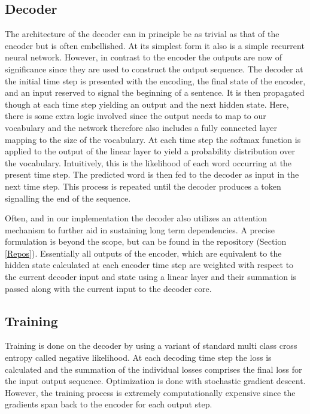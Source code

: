\documentclass{article}
\begin{document}
\subsection{Decoder}
The architecture of the decoder can in principle be as trivial as that of the encoder but is often embellished. At its simplest form it also is a simple recurrent neural network. However, in contrast to the encoder the outputs are now of significance since they are used to construct the output sequence. The decoder at the initial time step is presented with the encoding, the final state of the encoder, and an input reserved to signal the beginning of a sentence. It is then propagated though at each time step yielding an output and the next hidden state. Here, there is some extra logic involved since the output needs to map to our vocabulary and the network therefore also includes a fully connected layer mapping to the size of the vocabulary. At each time step the softmax function is applied to the output of the linear layer to yield a probability distribution over the vocabulary. Intuitively, this is the likelihood of each word occurring at the present time step. The predicted word is then fed to the decoder as input in the next time step. This process is repeated until the decoder produces a token signalling the end of the sequence. 

\noindent 
Often, and in our implementation the decoder also utilizes an attention mechanism to further aid in sustaining long term dependencies. A precise formulation is beyond the scope, but can be found in the repository (Section \ref{Repos}). Essentially all outputs of the encoder, which are equivalent to the hidden state calculated at each encoder time step are weighted with respect to the current decoder input and state using a linear layer and their summation is passed along with the current input to the decoder core. 

\subsection{Training}
Training is done on the decoder by using a variant of standard multi class cross entropy called negative likelihood. At each decoding time step the loss is calculated and the summation of the individual losses comprises the final loss for the input output sequence. Optimization is done with stochastic gradient descent. However, the training process is extremely computationally expensive since the gradients span back to the encoder for each output step.   
\end{document}
